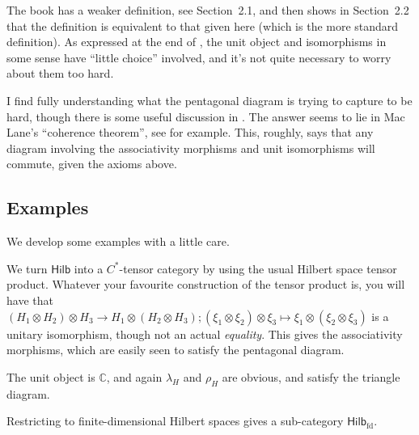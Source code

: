 \documentclass[a4paper,11pt]{article}
\theoremstyle{plain}
\theoremstyle{remark}
\newenvironment{example}
  {\pushQED{\qed}\renewcommand{\qedsymbol}{$\triangle$}\examplex}
  {\popQED\endexamplex}
\newcommand{\catHilb}{\textsf{Hilb}}
\newcommand{\catHilbFD}{\textsf{Hilb}_{\text{fd}}}
\begin{document}
The book \cite{EGNO_TensorCategories} has a weaker definition, see Section~2.1, and then shows in Section~2.2 that the definition is equivalent to that given here (which is the more standard definition).  As expressed at the end of \cite[Section~2.2]{EGNO_TensorCategories}, the unit object and isomorphisms in some sense have ``little choice'' involved, and it's not quite necessary to worry about them too hard.

I find fully understanding what the pentagonal diagram is trying to capture to be hard, though there is some useful discussion in \cite[Section~2.9]{EGNO_TensorCategories}.  The answer seems to lie in Mac Lane's ``coherence theorem'', see \cite[Section~VII.2]{MacLane_CFTWM2} for example.  This, roughly, says that any diagram involving the associativity morphisms and unit isomorphisms will commute, given the axioms above.



\subsection{Examples}

We develop some examples with a little care.

\begin{example}\label{eg:hilb_tensor}
We turn $\catHilb$ into a $C^*$-tensor category by using the usual Hilbert space tensor product.  Whatever your favourite construction of the tensor product is, you will have that $(H_1\otimes H_2)\otimes H_3 \to H_1\otimes (H_2\otimes H_3); (\xi_1\otimes\xi_2)\otimes\xi_3 \mapsto \xi_1\otimes(\xi_2\otimes\xi_3)$ is a unitary isomorphism, though not an actual \emph{equality}.  This gives the associativity morphisms, which are easily seen to satisfy the pentagonal diagram.

The unit object is $\mathbb C$, and again $\lambda_H$ and $\rho_H$ are obvious, and satisfy the triangle diagram.

Restricting to finite-dimensional Hilbert spaces gives a sub-category $\catHilbFD$.
\end{example}
\end{document}

